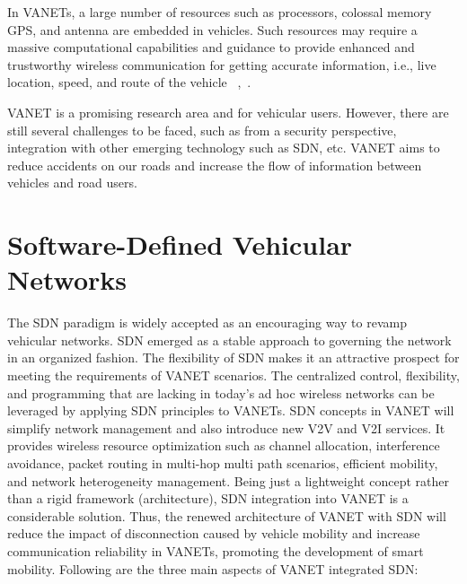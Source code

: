 \documentclass[
  oneside,
  11pt, a4paper,
  footinclude=true,
  headinclude=true,
  cleardoublepage=empty
]{scrbook}
\begin{document}
In VANETs, a large number of resources such as processors, colossal memory GPS, and antenna are embedded in vehicles. Such resources may require a massive computational capabilities and guidance to provide enhanced and trustworthy wireless communication for getting accurate information, i.e., live location, speed, and route of the vehicle ~\cite{vanetusarlater},~\cite{vanet2}. \par

VANET is a promising research area and for vehicular users. However, there are still several challenges to be faced, such as from a security perspective, integration with other emerging technology such as SDN, etc. VANET aims to reduce accidents on our roads and increase the flow of information between vehicles and road users.




\section{Software-Defined Vehicular Networks}
\label{Software-Defined Vehicular Networks}

The SDN paradigm is widely accepted as an encouraging way to revamp vehicular networks. SDN emerged as a stable approach to governing the network in an organized fashion. The flexibility of SDN makes it an attractive prospect for meeting the requirements of VANET scenarios. The centralized control, flexibility, and programming that are lacking in today's ad hoc wireless networks can be leveraged by applying SDN principles to VANETs. SDN concepts in VANET will simplify network management and also introduce new V2V and V2I services. It provides wireless resource optimization such as channel allocation, interference avoidance, packet routing in multi-hop multi path scenarios, efficient mobility, and network heterogeneity management. Being just a lightweight concept rather than a rigid framework (architecture), SDN integration into VANET is a considerable solution. Thus, the renewed architecture of VANET with SDN will reduce the impact of disconnection caused by vehicle mobility and increase communication reliability in VANETs, promoting the development of smart mobility. Following are the three main aspects of VANET integrated SDN:\par
\end{document}
